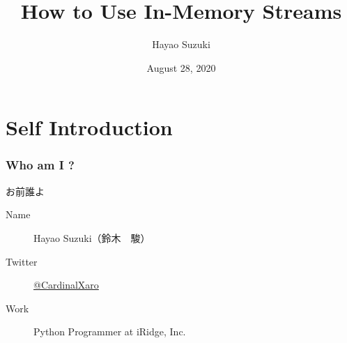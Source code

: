 \documentclass[dvipdfmx,12pt,notheorems]{beamer}
\title{How to Use In-Memory Streams}
\author[Hayao]{Hayao Suzuki}
\institute[PyCon JP 2020]{PyCon JP 2020}
\date{August 28, 2020}
\theoremstyle{definition}
\begin{document}
\begin{frame}[plain]\frametitle{}
\titlepage %
\end{frame}

\section{Self Introduction}

\begin{frame}\frametitle{Who am I ?}

\begin{block}{お前誰よ}
\begin{description}
\item[Name] Hayao Suzuki（鈴木　駿）
\item[Twitter] \href{https://twitter.com/CardinalXaro}{@CardinalXaro}
\item[Work] Python Programmer at iRidge, Inc.
\end{description}
\end{block}

\end{frame}


%
%
%
\end{document}
